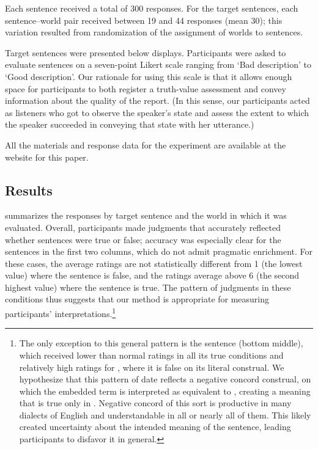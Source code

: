 \documentclass[leqno,12pt]{article}
\begin{document}
Each sentence received a
total of 300 responses. For the target sentences, each sentence--world
pair received between 19 and 44 responses (mean 30); this variation
resulted from randomization of the assignment of worlds to sentences. 

Target sentences were presented below displays. Participants were
asked to evaluate sentences on a seven-point
Likert scale ranging from `Bad description' to `Good description'. Our
rationale for using this scale is that it allows enough space for
participants to both register a truth-value assessment and convey
information about the quality of the report. (In this sense, our
participants acted as listeners who got to observe the speaker's state
and assess the extent to which the speaker succeeded in conveying that
state with her utterance.)

All the materials and response data for the experiment are available at
the website for this paper.


\subsection{Results}\label{sec:exp1:results}


 summarizes the responses by target sentence
and the world in which it was evaluated. Overall, participants made judgments that accurately reflected whether sentences were true or false; accuracy was
especially clear for the sentences in the first two columns, which do
not admit pragmatic enrichment. For these cases, the average ratings are not
statistically different from 1 (the lowest value) where the sentence
is false, and the ratings average above 6 (the second highest value)
where the sentence is true. The pattern of judgments in these
conditions thus suggests that our method is appropriate for measuring
participants' interpretations.\footnote{The only exception to this general pattern is the sentence  (bottom middle), which received lower than normal
ratings in all its true conditions and relatively high ratings for
, where it is false on its literal construal. We
hypothesize that this pattern of date reflects a
negative concord construal, on which the embedded term is interpreted
as equivalent to , creating a meaning that is
true only in . Negative concord of this sort is productive
in many dialects of English and understandable in all or nearly all of
them. This likely created uncertainty about the intended meaning of
the sentence, leading participants to disfavor it in general.}
\end{document}
